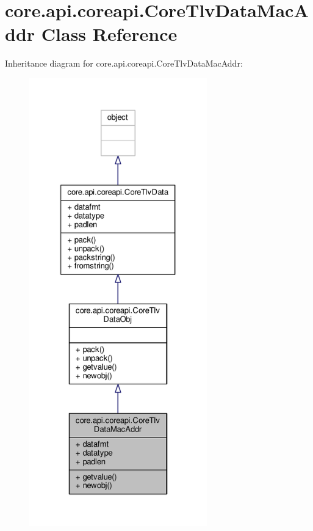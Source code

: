 \hypertarget{classcore_1_1api_1_1coreapi_1_1_core_tlv_data_mac_addr}{\section{core.\+api.\+coreapi.\+Core\+Tlv\+Data\+Mac\+Addr Class Reference}
\label{classcore_1_1api_1_1coreapi_1_1_core_tlv_data_mac_addr}
}


Inheritance diagram for core.\+api.\+coreapi.\+Core\+Tlv\+Data\+Mac\+Addr\+:
\nopagebreak
\begin{figure}[H]
\begin{center}
\leavevmode
\includegraphics[height=550pt]{classcore_1_1api_1_1coreapi_1_1_core_tlv_data_mac_addr__inherit__graph}
\end{center}
\end{figure}


